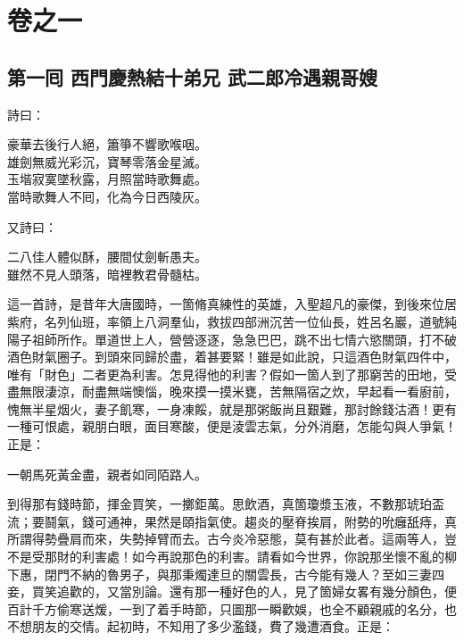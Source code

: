 \part*{{\titlename}卷之一}



\chapter*{第一囘 西門慶熱結十弟兄 武二郎冷遇親哥嫂}


詩曰：

\begin{myquote}
豪華去後行人絕，簫箏不響歌喉咽。\\
雄劍無威光彩沉，寶琴零落金星滅。\\
玉堦寂寞墜秋露，月照當時歌舞處。\\
當時歌舞人不囘，化為今日西陵灰。{}
\end{myquote}

又詩曰：

\begin{myquote}
二八佳人體似酥，腰間仗劍斬愚夫。{}\\
雖然不見人頭落，暗裡教君骨髓枯。
\end{myquote}

這一首詩，是昔年大唐國時，一箇脩真練性的英雄，入聖超凡的豪傑，到後來位居紫府，名列仙班，率領上八洞羣仙，救拔四部洲沉苦一位仙長，姓呂名巖，道號純陽子祖師所作。單道世上人，營營逐逐，急急巴巴，跳不出七情六慾關頭，打不破酒色財氣圈子。到頭來同歸於盡，着甚要緊！雖是如此說，只這酒色財氣四件中，唯有「財色」二者更為利害。怎見得他的利害？假如一箇人到了那窮苦的田地，受盡無限淒涼，耐盡無端懊惱，晚來摸一摸米甕，苦無隔宿之炊，早起看一看廚前，愧無半星烟火，妻子飢寒，一身凍餒，{}就是那粥飯尚且艱難，那討餘錢沽酒！{}更有一種可恨處，親朋白眼，面目寒酸，便是淩雲志氣，分外消磨，怎能勾與人爭氣！{}正是：

\begin{myquote}
一朝馬死黃金盡，親者如同陌路人。
\end{myquote}

到得那有錢時節，揮金買笑，一擲鉅萬。思飲酒，真箇瓊漿玉液，{}不數那琥珀盃流；要鬪氣，錢可通神，果然是頤指氣使。{}趨炎的壓脊挨肩，附勢的吮癰舐痔，真所謂得勢疊肩而來，失勢掉臂而去。古今炎冷惡態，莫有甚於此者。這兩等人，豈不是受那財的利害處！如今再說那色的利害。{}請看如今世界，你說那坐懷不亂的柳下惠，閉門不納的魯男子，與那秉燭達旦的關雲長，古今能有幾人？至如三妻四妾，買笑追歡的，又當別論。還有那一種好色的人，見了箇婦女畧有幾分顏色，便百計千方偷寒送煖，一到了着手時節，只圖那一瞬歡娛，也全不顧親戚的名分，也不想朋友的交情。起初時，不知用了多少濫錢，費了幾遭酒食。{}正是：


